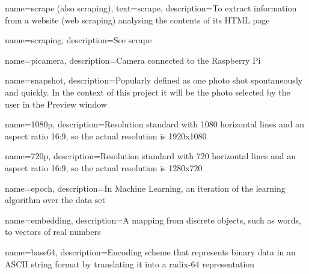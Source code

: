 
{
        name=scrape (\textmd{also} scraping),
        text=scrape,
        description={To extract information from a website (web scraping) analysing the contents of its HTML page}
}

{
        name=scraping,
        description={See \gls{scrape}}
}


{
        name=picamera,
        description={Camera connected to the Raspberry Pi}
}

{
        name=snapshot,
        description={Popularly defined as one photo shot spontaneously and quickly. In the context of this project it will be the photo selected by the user in the Preview window}
}

{
        name=1080p,
        description={Resolution standard with 1080 horizontal lines and an aspect ratio 16:9, so the actual resolution is 1920x1080}
}

{
        name=720p,
        description={Resolution standard with 720 horizontal lines and an aspect ratio 16:9, so the actual resolution is 1280x720}
}

{
        name=epoch,
        description={In Machine Learning, an iteration of the learning algorithm over the data set}
}


{
        name=embedding,
        description={A mapping from discrete objects, such as words, to vectors of real numbers}
}

{
        name=base64,
        description={Encoding scheme that represents binary data in an ASCII string format by translating it into a radix-64 representation}
}















